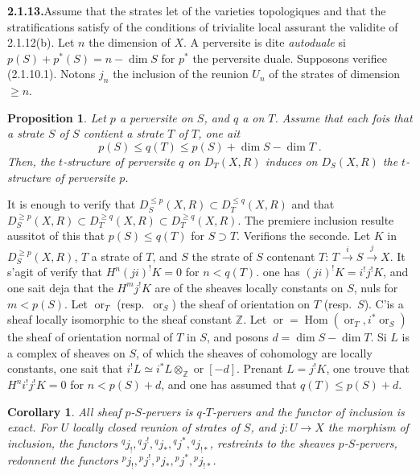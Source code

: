 \documentclass[12pt,a4paper]{article}
\theoremstyle{plain}
\newtheorem{proposition}[theorem]{Proposition}
\newtheorem{corollary}[theorem]{Corollary}
\theoremstyle{definition}
\DeclareMathOperator{\Hom}{Hom}
\begin{document}
\smallskip
\noindent\textbf{2.1.13.}\quad Assume that the strates let of the varieties topologiques and that the stratifications satisfy of the conditions of trivialite local assurant the validite of 2.1.12(b). Let $n$ the dimension of $X$. A perversite is dite \emph{autoduale} si $p(S) + p^*(S) = n - \dim S$ for $p^*$ the perversite duale. Supposons verifiee (2.1.10.1). Notons $j_n$ the inclusion of the reunion $U_n$ of the strates of dimension $\geqslant n$.

\begin{proposition}\label{prop:2.1.14}
Let $p$ a perversite on $S$, and $q$ a on $T$. Assume that each fois that a strate $S$ of $S$ contient a strate $T$ of $T$, one ait
\[
p(S) \leqslant q(T) \leqslant p(S) + \dim S - \dim T\;.
\]
Then, the $t$-structure of perversite $q$ on $D_T(X, R)$ induces on $D_S(X, R)$ the $t$-structure of perversite $p$.
\end{proposition}

It is enough to verify that $D_S^{\leqslant p}(X, R) \subset D_T^{\leqslant q}(X, R)$ and that $D_S^{\geqslant p}(X, R) \subset D_T^{\geqslant q}(X, R) \subset D_T^{\geqslant q}(X, R)$. The premiere inclusion resulte aussitot of this that $p(S) \leqslant q(T)$ for $S \supset T$. Verifions the seconde. Let $K$ in $D_S^{\geqslant p}(X, R)$, $T$ a strate of $T$, and $S$ the strate of $S$ contenant $T$: $T \xrightarrow{i} S \xrightarrow{j} X$. It s'agit of verify that $H^n(ji)^! K = 0$ for $n < q(T)$. one has $(ji)^! K = i^! j^! K$, and one sait deja that the $H^m j^! K$ are of the sheaves locally constants on $S$, nuls for $m < p(S)$. Let $\operatorname{or}_T$ (resp.\ $\operatorname{or}_S$) the sheaf of orientation on $T$ (resp.\ $S$). C'is a sheaf locally isomorphic to the sheaf constant $\mathbb{Z}$. Let $\operatorname{or} = \Hom(\operatorname{or}_T, i^* \operatorname{or}_S)$ the sheaf of orientation normal of $T$ in $S$, and posons $d = \dim S - \dim T$. Si $L$ is a complex of sheaves on $S$, of which the sheaves of cohomology are locally constants, one sait that $i^! L \simeq i^* L \otimes_{\mathbb{Z}} \operatorname{or}[-d]$. Prenant $L = j^! K$, one trouve that $H^n i^! j^! K = 0$ for $n < p(S) + d$, and one has assumed that $q(T) \leqslant p(S) + d$.

\begin{corollary}\label{cor:2.1.15}
All sheaf $p$-$S$-pervers is $q$-$T$-pervers and the functor of inclusion is exact. For $U$ locally closed reunion of strates of $S$, and $j : U \to X$ the morphism of inclusion, the functors ${}^q j_!, {}^q j^!, {}^q j_*, {}^q j^*, {}^q j_{!*}$, restreints to the sheaves $p$-$S$-pervers, redonnent the functors ${}^p j_!, {}^p j^!, {}^p j_*, {}^p j^*, {}^p j_{!*}$.
\end{corollary}
\end{document}
